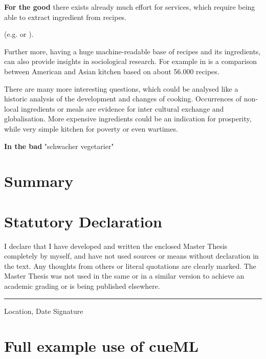 \documentclass[12pt, twoside]{report}
\begin{document}
\textbf{For the good} there exists already much effort for services, which require being able to extract ingredient from recipes.

 (e.g. \cite{ingredientNetworks} or \cite{recipeRecommendation}).

Further more, having a huge machine-readable base of recipes and its ingredients, can also provide insights in sociological research. For example in \parencite{FlavorNetwork} is a comparison between American and Asian kitchen based on about 56.000 recipes.

There are many more interesting questions, which could be analysed like a historic analysis of the development and changes of cooking. Occurrences of non-local ingredients or meals are evidence for inter cultural exchange and globalisation. More expensive ingredients could be an indication for prosperity, while very simple kitchen for poverty or even wartimes.

\textbf{In the bad} \parencite{clintonHealth} "schwacher vegetarier"


\chapter{Summary}


\appendix
\chapter{Statutory Declaration}
I declare that I have developed and written the enclosed Master Thesis completely by myself, and have not used sources or means without declaration in the text. Any thoughts from others or literal quotations are clearly marked. The Master Thesis was not used in the same or in a similar version to achieve an academic grading or is being published elsewhere.
\newline
\newline
\newline
\rule{\textwidth}{1pt}
Location, Date \hfill Signature 



\chapter{Full example use of cueML} \label{appendix:fullUseOfCueML}
\end{document}
